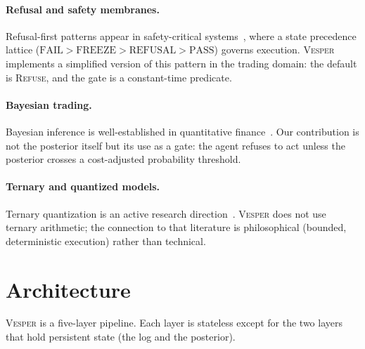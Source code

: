 \documentclass[11pt,a4paper]{article}
\newcommand{\gld}[1]{\textcolor{goldshiny}{#1}}
\theoremstyle{definition}
\begin{document}
\paragraph{Refusal and safety membranes.}
Refusal-first patterns appear in safety-critical systems~\cite{arcstone-2025}, where a state precedence lattice ($\mathrm{FAIL} > \mathrm{FREEZE} > \mathrm{REFUSAL} > \mathrm{PASS}$) governs execution. \textsc{Vesper} implements a simplified version of this pattern in the trading domain: the default is \textsc{Refuse}, and the gate is a constant-time predicate.

\paragraph{Bayesian trading.}
Bayesian inference is well-established in quantitative finance~\cite{prado-2018}. Our contribution is not the posterior itself but its use as a \gld{gate}: the agent refuses to act unless the posterior crosses a cost-adjusted probability threshold.

\paragraph{Ternary and quantized models.}
Ternary quantization is an active research direction~\cite{tequila-2026,vitallm-2025}. \textsc{Vesper} does not use ternary arithmetic; the connection to that literature is philosophical (bounded, deterministic execution) rather than technical.

\section{Architecture}
\label{sec:arch}

\textsc{Vesper} is a five-layer pipeline. Each layer is stateless except for the two layers that hold persistent state (the log and the posterior).
\end{document}
